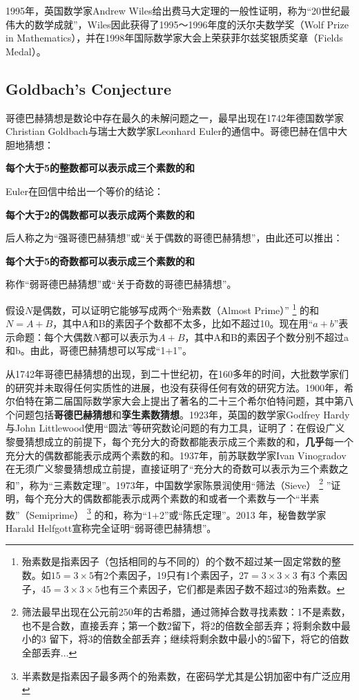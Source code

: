 1995年，英国数学家Andrew Wiles给出费马大定理的一般性证明，称为“20世纪最伟大的数学成就”，Wiles因此获得了1995～1996年度的沃尔夫数学奖（Wolf Prize in Mathematics），并在1998年国际数学家大会上荣获菲尔兹奖银质奖章（Fields Medal）。
\subsection{Goldbach's Conjecture}
哥德巴赫猜想是数论中存在最久的未解问题之一，最早出现在1742年德国数学家Christian Goldbach与瑞士大数学家Leonhard Euler的通信中。哥德巴赫在信中大胆地猜想：\\
\centerline{\textbf{每个大于5的整数都可以表示成三个素数的和}}

Euler在回信中给出一个等价的结论：\\
\centerline{\textbf{每个大于2的偶数都可以表示成两个素数的和}}
后人称之为“强哥德巴赫猜想”或“关于偶数的哥德巴赫猜想”，由此还可以推出：\\
\centerline{\textbf{每个大于5的奇数都可以表示成三个素数的和}}
称作“弱哥德巴赫猜想”或“关于奇数的哥德巴赫猜想”。

假设$N$是偶数，可以证明它能够写成两个“殆素数（Almost Prime）”
\footnote{殆素数是指素因子（包括相同的与不同的）的个数不超过某一固定常数的整数。如$15=3\times 5$有2个素因子，19只有1个素因子，$27=3\times 3\times 3$ 有3 个素因子，$45=3\times 3\times 5$也有三个素因子，它们都是素因子数不超过3的殆素数。}
的和$N=A+B$，其中A和B的素因子个数都不太多，比如不超过10。现在用“$a+b$”表示命题：每个大偶数$N$都可以表示为$A+B$，其中A和B的素因子个数分别不超过a和b。由此，哥德巴赫猜想可以写成“1+1”。

从1742年哥德巴赫猜想的出现，到二十世纪初，在160多年的时间，大批数学家们的研究并未取得任何实质性的进展，也没有获得任何有效的研究方法。1900年，希尔伯特在第二届国际数学家大会上提出了著名的二十三个希尔伯特问题，其中第八个问题包括\textbf{哥德巴赫猜想}和\textbf{孪生素数猜想}。1923年，英国的数学家Godfrey Hardy与John Littlewood使用“圆法”等研究数论问题的有力工具，证明了：在假设广义黎曼猜想成立的前提下，每个充分大的奇数都能表示成三个素数的和，\textbf{几乎}每一个充分大的偶数都能表示成两个素数的和。1937年，前苏联数学家Ivan Vinogradov在无须广义黎曼猜想成立前提，直接证明了“充分大的奇数可以表示为三个素数之和”，称为“三素数定理”。1973年，中国数学家陈景润使用“筛法（Sieve）
\footnote{筛法最早出现在公元前250年的古希腊，通过筛掉合数寻找素数：1不是素数，也不是合数，直接丢弃；第一个数2留下，将2的倍数全部丢弃；将剩余数中最小的3 留下，将3的倍数全部丢弃；继续将剩余数中最小的5留下，将它的倍数全部丢弃$\dots$}
”证明，每个充分大的偶数都能表示成两个素数的和或者一个素数与一个“半素数”（Semiprime）
\footnote{半素数是指素因子最多两个的殆素数，在密码学尤其是公钥加密中有广泛应用}
的和，称为“1+2”或“陈氏定理”。2013 年，秘鲁数学家Harald Helfgott\cite{helfgott2013major}宣称完全证明“弱哥德巴赫猜想”。

